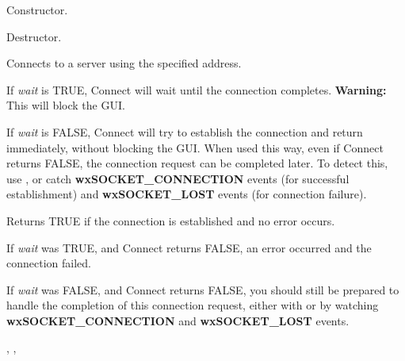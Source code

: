 Constructor.



%
%


Destructor.

%
%
\label{wxsocketclientconnect}


Connects to a server using the specified address.

If {\it wait} is TRUE, Connect will wait until the connection completes.
{\bf Warning:} This will block the GUI.

If {\it wait} is FALSE, Connect will try to establish the connection and
return immediately, without blocking the GUI. When used this way, even if
Connect returns FALSE, the connection request can be completed later.
To detect this, use ,
or catch {\bf wxSOCKET\_CONNECTION} events (for successful establishment)
and {\bf wxSOCKET\_LOST} events (for connection failure).





Returns TRUE if the connection is established and no error occurs.

If {\it wait} was TRUE, and Connect returns FALSE, an error occurred
and the connection failed.

If {\it wait} was FALSE, and Connect returns FALSE, you should still
be prepared to handle the completion of this connection request, either
with  or by watching 
{\bf wxSOCKET\_CONNECTION} and {\bf wxSOCKET\_LOST} events.


, 
, 

